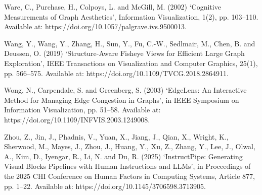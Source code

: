 \documentclass[11pt,a4paper,oneside,extrafontsizes]{memoir}
\begin{document}
Ware, C., Purchase, H., Colpoys, L. and McGill, M. (2002) ‘Cognitive Measurements of Graph Aesthetics’, Information Visualization, 1(2), pp. 103–110. Available at: https://doi.org/10.1057/palgrave.ivs.9500013.

Wang, Y., Wang, Y., Zhang, H., Sun, Y., Fu, C.-W., Sedlmair, M., Chen, B. and Deussen, O. (2019) ‘Structure-Aware Fisheye Views for Efficient Large Graph Exploration’, IEEE Transactions on Visualization and Computer Graphics, 25(1), pp. 566–575. Available at: https://doi.org/10.1109/TVCG.2018.2864911.

Wong, N., Carpendale, S. and Greenberg, S. (2003) ‘EdgeLens: An Interactive Method for Managing Edge Congestion in Graphs’, in IEEE Symposium on Information Visualization, pp. 51–58. Available at: https://doi.org/10.1109/INFVIS.2003.1249008.

Zhou, Z., Jin, J., Phadnis, V., Yuan, X., Jiang, J., Qian, X., Wright, K., Sherwood, M., Mayes, J., Zhou, J., Huang, Y., Xu, Z., Zhang, Y., Lee, J., Olwal, A., Kim, D., Iyengar, R., Li, N. and Du, R. (2025) ‘InstructPipe: Generating Visual Blocks Pipelines with Human Instructions and LLMs’, in Proceedings of the 2025 CHI Conference on Human Factors in Computing Systems, Article 877, pp. 1–22. Available at: https://doi.org/10.1145/3706598.3713905.
\end{document}
